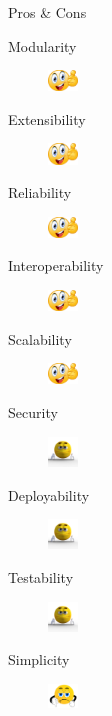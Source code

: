 \documentclass{slide}
\begin{document}
\begin{frame}{Pros \& Cons}
    \vspace{1mm}
    {\LARGE
    \begin{description}
        \item[Modularity] \tabto{15em}\includegraphics[width=8mm]{../../shared/images/thumbs-up.png}
        \item[Extensibility] \tabto{15em}\includegraphics[width=8mm]{../../shared/images/thumbs-up.png}
        \item[Reliability] \tabto{15em}\includegraphics[width=8mm]{../../shared/images/thumbs-up.png}
        \item[Interoperability] \tabto{15em}\includegraphics[width=8mm]{../../shared/images/thumbs-up.png}
        \item[Scalability] \tabto{15em}\includegraphics[width=8mm]{../../shared/images/thumbs-up.png}
        \item[Security] \tabto{15em}\includegraphics[trim=57 145 70 85,clip,width=8mm]{../../shared/images/neutral.png}
        \item[Deployability] \tabto{15em}\includegraphics[trim=22 19 22 12,clip,width=8mm]{../../shared/images/neutral.png}
        \item[Testability] \tabto{15em}\includegraphics[trim=22 19 22 12,clip,width=8mm]{../../shared/images/neutral.png}
        \item[Simplicity] \tabto{15em}\includegraphics[trim=22 19 22 12,clip,width=8mm]{../../shared/images/thumbs-down.png}
    \end{description}
    }
\end{frame}
\end{document}
